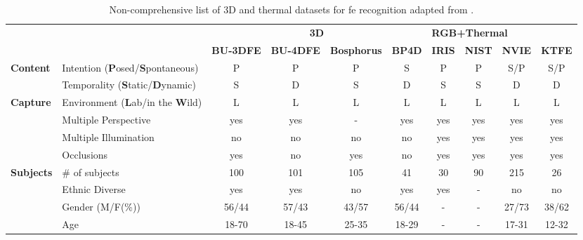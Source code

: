 \begin{sidewaystable}[]
\centering
\caption{Non-comprehensive list of 3D and thermal datasets for \gls{fe} recognition adapted from \cite{Corneanu2016survey}.}
\label{tab:3DThermaldatasets}
\begin{tabular}{llcccccccc}
\toprule
                          &                                         & \multicolumn{4}{c}{\textbf{3D}}                & \multicolumn{4}{l}{\textbf{RGB+Thermal}} \\ \cmidrule(l){3-6}\cmidrule(l){7-10} 
                          &                                         & \textbf{BU-3DFE} & \textbf{BU-4DFE} & \textbf{Bosphorus} & \textbf{BP4D}  & \textbf{IRIS}  & \textbf{NIST}  & \textbf{NVIE}   & \textbf{KTFE}   \\ \midrule
\multirow{2}{*}{\textbf{Content}}  & Intention \footnotesize{(\textbf{P}osed/\textbf{S}pontaneous)}   & P       & P       & P         & S     & P     & P     & S/P    & S/P    \\
                          & Temporality \footnotesize{(\textbf{S}tatic/\textbf{D}ynamic)}    & S       & D       & S         & D     & S     & S     & D      & D      \\ \midrule
\multirow{4}{*}{\textbf{Capture}}  & Environment \footnotesize{(\textbf{L}ab/in the \textbf{W}ild)} & L       & L       & L         & L     & L     & L     & L      & L      \\
                          & Multiple Perspective                    & yes     & yes     & -         & yes   & yes   & yes   & yes    & yes    \\
                          & Multiple Illumination                   & no      & no      & no        & no    & yes   & yes   & yes    & yes    \\
                          & Occlusions                              & yes     & no      & yes       & no    & yes   & yes   & yes    & yes    \\ \midrule
\multirow{4}{*}{\textbf{Subjects}} & \# of subjects                          & 100     & 101     & 105       & 41    & 30    & 90    & 215    & 26     \\
                          & Ethnic Diverse                          & yes     & yes     & no        & yes   & yes   & -     & no     & no     \\
                          & Gender \footnotesize{(M/F(\%))}              & 56/44   & 57/43   & 43/57     & 56/44 & -     & -     & 27/73  & 38/62  \\
                          & Age                                     & 18-70   & 18-45   & 25-35     & 18-29 & -     & -     & 17-31  & 12-32 
\end{tabular}
\end{sidewaystable}





